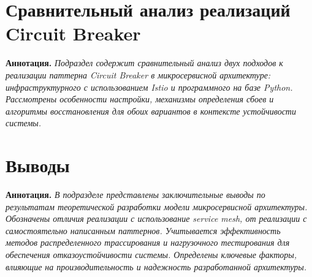   
\section{Сравнительный анализ реализаций Circuit Breaker}
  
\textbf{Аннотация.} \textit{Подраздел содержит сравнительный анализ двух подходов к реализации паттерна Circuit Breaker в микросервисной архитектуре: инфраструктурного с использованием Istio и программного на базе Python. Рассмотрены особенности настройки, механизмы определения сбоев и алгоритмы восстановления для обоих вариантов в контексте устойчивости системы.}

  
\section{Выводы}
  
\textbf{Аннотация.} \textit{В подразделе представлены заключительные выводы по результатам теоретической разработки модели микросервисной архитектуры. Обозначены отличия реализации с использование service mesh, от реализации с самостоятельно написанным паттернов. Учитывается эффективность методов распределенного трассирования и нагрузочного тестирования для обеспечения отказоустойчивости системы. Определены ключевые факторы, влияющие на производительность и надежность разработанной архитектуры.}




